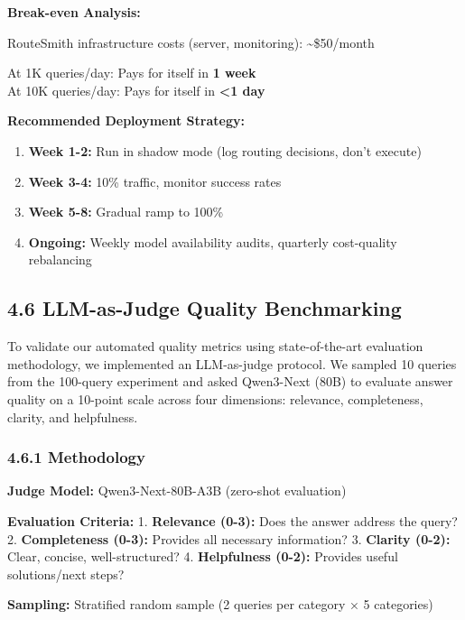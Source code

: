 \documentclass[
]{article}
\providecommand{\tightlist}{%
  \setlength{\itemsep}{0pt}\setlength{\parskip}{0pt}}
\begin{document}
\textbf{Break-even Analysis:}

RouteSmith infrastructure costs (server, monitoring):
\textasciitilde\$50/month

At 1K queries/day: Pays for itself in \textbf{1 week}\\
At 10K queries/day: Pays for itself in \textbf{\textless1 day}

\textbf{Recommended Deployment Strategy:}

\begin{enumerate}
\def\labelenumi{\arabic{enumi}.}
\tightlist
\item
  \textbf{Week 1-2:} Run in shadow mode (log routing decisions, don't
  execute)
\item
  \textbf{Week 3-4:} 10\% traffic, monitor success rates
\item
  \textbf{Week 5-8:} Gradual ramp to 100\%
\item
  \textbf{Ongoing:} Weekly model availability audits, quarterly
  cost-quality rebalancing
\end{enumerate}

\hypertarget{llm-as-judge-quality-benchmarking}{%
\subsection{4.6 LLM-as-Judge Quality
Benchmarking}\label{llm-as-judge-quality-benchmarking}}

To validate our automated quality metrics using state-of-the-art
evaluation methodology, we implemented an LLM-as-judge protocol. We
sampled 10 queries from the 100-query experiment and asked Qwen3-Next
(80B) to evaluate answer quality on a 10-point scale across four
dimensions: relevance, completeness, clarity, and helpfulness.

\hypertarget{methodology-1}{%
\subsubsection{4.6.1 Methodology}\label{methodology-1}}

\textbf{Judge Model:} Qwen3-Next-80B-A3B (zero-shot evaluation)

\textbf{Evaluation Criteria:} 1. \textbf{Relevance (0-3):} Does the
answer address the query? 2. \textbf{Completeness (0-3):} Provides all
necessary information? 3. \textbf{Clarity (0-2):} Clear, concise,
well-structured? 4. \textbf{Helpfulness (0-2):} Provides useful
solutions/next steps?

\textbf{Sampling:} Stratified random sample (2 queries per category × 5
categories)
\end{document}
